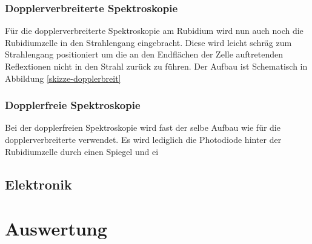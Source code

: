 \documentclass[12pt]{article}
\begin{document}
\subsubsection{Dopplerverbreiterte Spektroskopie}
Für die dopplerverbreiterte Spektroskopie am Rubidium wird nun auch noch die Rubidiumzelle in den Strahlengang eingebracht.
Diese wird leicht schräg zum Strahlengang positioniert um die an den Endflächen der Zelle auftretenden Reflextionen nicht in den Strahl zurück zu führen. Der Aufbau ist Schematisch in Abbildung \ref{skizze-dopplerbreit}
\subsubsection{Dopplerfreie Spektroskopie}
Bei der dopplerfreien Spektroskopie wird fast der selbe Aufbau wie für die dopplerverbreiterte verwendet. Es wird lediglich die Photodiode hinter der Rubidiumzelle durch einen Spiegel und ei

\subsection{Elektronik}
\section{Auswertung}
\end{document}
